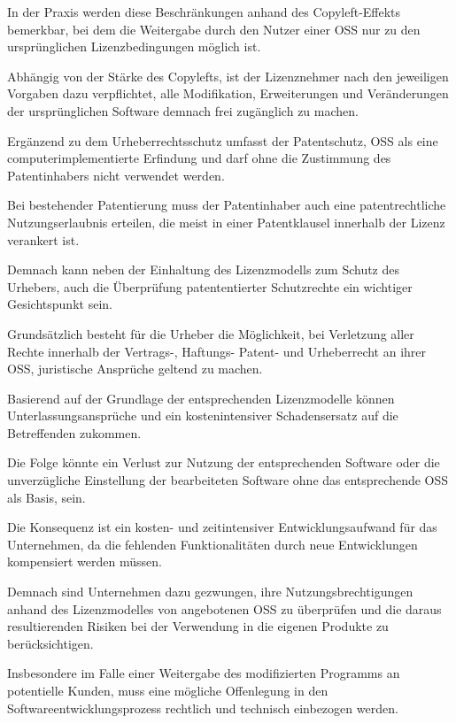 In der Praxis werden diese Beschränkungen anhand des Copyleft-Effekts bemerkbar, bei dem die Weitergabe durch den Nutzer einer OSS nur zu den ursprünglichen Lizenzbedingungen möglich ist.\cite[S. 184]{sujecki__2005}

Abhängig von der Stärke des Copylefts, ist der Lizenznehmer nach den jeweiligen Vorgaben dazu verpflichtet, alle Modifikation, Erweiterungen und Veränderungen der ursprünglichen Software demnach frei zugänglich zu machen.

Ergänzend zu dem Urheberrechtsschutz umfasst der Patentschutz, OSS als eine computerimplementierte Erfindung und darf ohne die Zustimmung des Patentinhabers nicht verwendet werden.

Bei bestehender Patentierung muss der Patentinhaber auch eine patentrechtliche Nutzungserlaubnis erteilen, die meist in einer Patentklausel innerhalb der Lizenz verankert ist. 

Demnach kann neben der Einhaltung des Lizenzmodells zum Schutz des Urhebers, auch die Überprüfung patententierter Schutzrechte ein wichtiger Gesichtspunkt sein.   

Grundsätzlich besteht für die Urheber die Möglichkeit, bei Verletzung aller Rechte innerhalb der Vertrags-, Haftungs- Patent- und Urheberrecht an ihrer OSS, juristische Ansprüche geltend zu machen.

Basierend auf der Grundlage der entsprechenden Lizenzmodelle können Unterlassungsansprüche und ein kostenintensiver Schadensersatz auf die Betreffenden zukommen.\cite{helmreich_geschaftsrisiken_2012}

Die Folge könnte ein Verlust zur Nutzung der entsprechenden Software oder die unverzügliche Einstellung der bearbeiteten Software ohne das entsprechende OSS als Basis, sein. 

Die Konsequenz ist ein kosten- und zeitintensiver Entwicklungsaufwand für das Unternehmen, da die fehlenden Funktionalitäten durch neue Entwicklungen kompensiert werden müssen. 

Demnach sind Unternehmen dazu gezwungen, ihre Nutzungsbrechtigungen anhand des Lizenzmodelles von angebotenen OSS zu überprüfen und die daraus resultierenden Risiken bei der Verwendung in die eigenen Produkte zu berücksichtigen.  

Insbesondere im Falle einer Weitergabe des modifizierten Programms an potentielle Kunden, muss eine mögliche Offenlegung in den Softwareentwicklungsprozess rechtlich und technisch einbezogen werden.  

